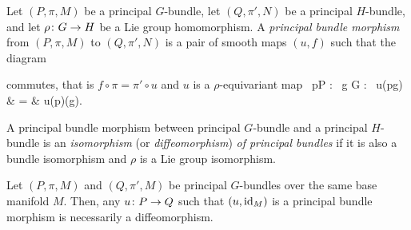 \bd
Let $(P,\pi,M)$ be a principal $G$-bundle, let $(Q,\pi',N)$ be a principal $H$-bundle, and let $\rho\colon G \to H$ be a Lie group homomorphism. A \emph{principal bundle morphism} from $(P,\pi,M)$ to $(Q,\pi',N)$ is a pair of smooth maps $(u,f)$ such that the diagram
\bse
{}
\ese
commutes, that is $f \circ \pi=\pi'\circ u $ and $u$ is a $\rho$-equivariant map
\forall \, p\in P : \forall \, g \in G : \ u(p\racts g) & = & u(p)\blacktriangleleft \rho(g).
\ei
\ed

\bd
A principal bundle morphism between principal $G$-bundle and a principal $H$-bundle is an \emph{isomorphism} (or \emph{diffeomorphism}) \emph{of principal bundles} if it is also a bundle isomorphism and $\rho$ is a Lie group isomorphism.
\ed

\bl
Let $(P,\pi,M)$ and $(Q,\pi',M)$ be principal $G$-bundles over the same base manifold $M$. Then, any $u\colon P \to Q$ such that $(u,\operatorname{id}_M)$ is a principal bundle morphism is necessarily a diffeomorphism.
\bse
{}
\ese
\el

